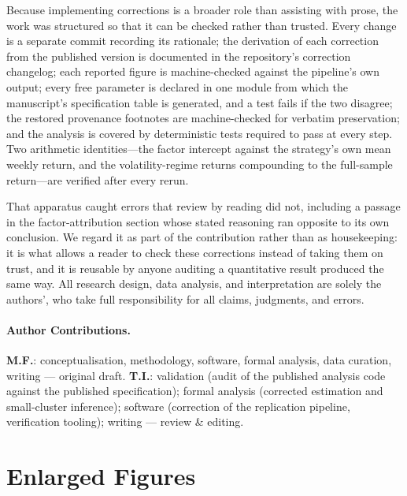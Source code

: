 \documentclass[11pt]{article}
\begin{document}
Because implementing corrections is a broader role than assisting with prose, the work was structured so that it can be checked rather than trusted. Every change is a separate commit recording its rationale; the derivation of each correction from the published version is documented in the repository's correction changelog; each reported figure is machine-checked against the pipeline's own output; every free parameter is declared in one module from which the manuscript's specification table is generated, and a test fails if the two disagree; the restored provenance footnotes are machine-checked for verbatim preservation; and the analysis is covered by deterministic tests required to pass at every step. Two arithmetic identities---the factor intercept against the strategy's own mean weekly return, and the volatility-regime returns compounding to the full-sample return---are verified after every rerun.

That apparatus caught errors that review by reading did not, including a passage in the factor-attribution section whose stated reasoning ran opposite to its own conclusion. We regard it as part of the contribution rather than as housekeeping: it is what allows a reader to check these corrections instead of taking them on trust, and it is reusable by anyone auditing a quantitative result produced the same way. All research design, data analysis, and interpretation are solely the authors', who take full responsibility for all claims, judgments, and errors.

\paragraph{Author Contributions.} \textbf{M.F.}: conceptualisation, methodology, software, formal analysis, data curation, writing --- original draft. \textbf{T.I.}: validation (audit of the published analysis code against the published specification); formal analysis (corrected estimation and small-cluster inference); software (correction of the replication pipeline, verification tooling); writing --- review \& editing.


\clearpage



\clearpage
\appendix

\section{Enlarged Figures}
\label{appendix:figures}
\end{document}
